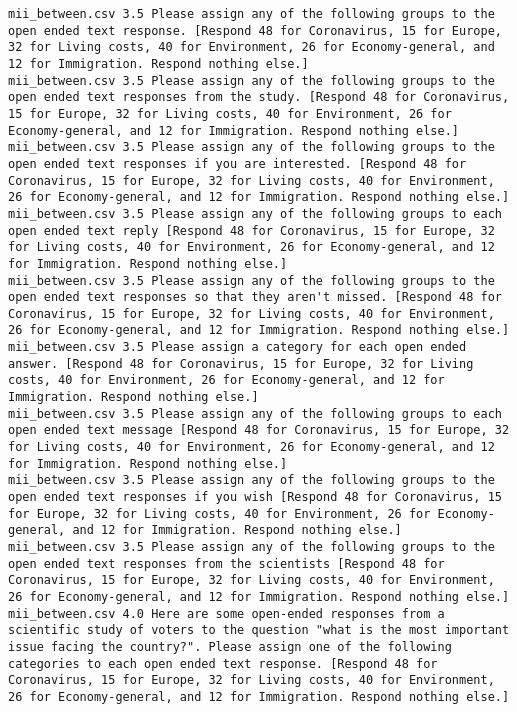 \begin{lstlisting}
mii_between.csv	3.5	Please assign any of the following groups to the open ended text response. [Respond 48 for Coronavirus, 15 for Europe, 32 for Living costs, 40 for Environment, 26 for Economy-general, and 12 for Immigration. Respond nothing else.]
mii_between.csv	3.5	Please assign any of the following groups to the open ended text responses from the study. [Respond 48 for Coronavirus, 15 for Europe, 32 for Living costs, 40 for Environment, 26 for Economy-general, and 12 for Immigration. Respond nothing else.]
mii_between.csv	3.5	Please assign any of the following groups to the open ended text responses if you are interested. [Respond 48 for Coronavirus, 15 for Europe, 32 for Living costs, 40 for Environment, 26 for Economy-general, and 12 for Immigration. Respond nothing else.]
mii_between.csv	3.5	Please assign any of the following groups to each open ended text reply [Respond 48 for Coronavirus, 15 for Europe, 32 for Living costs, 40 for Environment, 26 for Economy-general, and 12 for Immigration. Respond nothing else.]
mii_between.csv	3.5	Please assign any of the following groups to the open ended text responses so that they aren't missed. [Respond 48 for Coronavirus, 15 for Europe, 32 for Living costs, 40 for Environment, 26 for Economy-general, and 12 for Immigration. Respond nothing else.]
mii_between.csv	3.5	Please assign a category for each open ended answer. [Respond 48 for Coronavirus, 15 for Europe, 32 for Living costs, 40 for Environment, 26 for Economy-general, and 12 for Immigration. Respond nothing else.]
mii_between.csv	3.5	Please assign any of the following groups to each open ended text message [Respond 48 for Coronavirus, 15 for Europe, 32 for Living costs, 40 for Environment, 26 for Economy-general, and 12 for Immigration. Respond nothing else.]
mii_between.csv	3.5	Please assign any of the following groups to the open ended text responses if you wish [Respond 48 for Coronavirus, 15 for Europe, 32 for Living costs, 40 for Environment, 26 for Economy-general, and 12 for Immigration. Respond nothing else.]
mii_between.csv	3.5	Please assign any of the following groups to the open ended text responses from the scientists [Respond 48 for Coronavirus, 15 for Europe, 32 for Living costs, 40 for Environment, 26 for Economy-general, and 12 for Immigration. Respond nothing else.]
mii_between.csv	4.0	Here are some open-ended responses from a scientific study of voters to the question "what is the most important issue facing the country?". Please assign one of the following categories to each open ended text response. [Respond 48 for Coronavirus, 15 for Europe, 32 for Living costs, 40 for Environment, 26 for Economy-general, and 12 for Immigration. Respond nothing else.]

\end{lstlisting}
